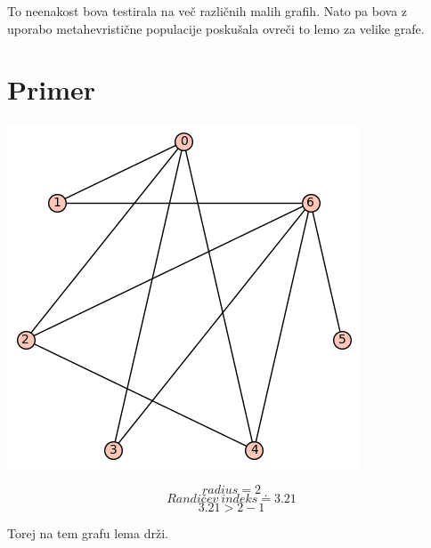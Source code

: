 \documentclass[a4paper, 10pt]{article}
\begin{document}
To neenakost bova testirala na več različnih malih grafih. Nato pa bova z uporabo metahevristične populacije poskušala ovreči to lemo za velike grafe.

\section{Primer}

\includegraphics{primer}

$$radius = 2$$
$$Randičev \ indeks \doteq 3.21$$
$$3.21 > 2 - 1$$

Torej na tem grafu lema drži.
\end{document}
